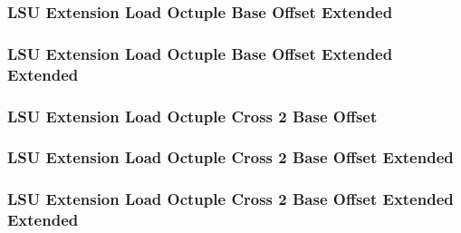 

\subsubsection[{\small LSU Extension Load Octuple Base Offset Extended}]{LSU Extension Load Octuple Base Offset Extended} \label{sec:format-LSU-XLOBO.X}



\subsubsection[{\small LSU Extension Load Octuple Base Offset Extended Extended}]{LSU Extension Load Octuple Base Offset Extended Extended} \label{sec:format-LSU-XLOBO.Y}



\subsubsection[{\small LSU Extension Load Octuple Cross 2 Base Offset}]{LSU Extension Load Octuple Cross 2 Base Offset} \label{sec:format-LSU-XLOC2BO}



\subsubsection[{\small LSU Extension Load Octuple Cross 2 Base Offset Extended}]{LSU Extension Load Octuple Cross 2 Base Offset Extended} \label{sec:format-LSU-XLOC2BO.X}



\subsubsection[{\small LSU Extension Load Octuple Cross 2 Base Offset Extended Extended}]{LSU Extension Load Octuple Cross 2 Base Offset Extended Extended} \label{sec:format-LSU-XLOC2BO.Y}

